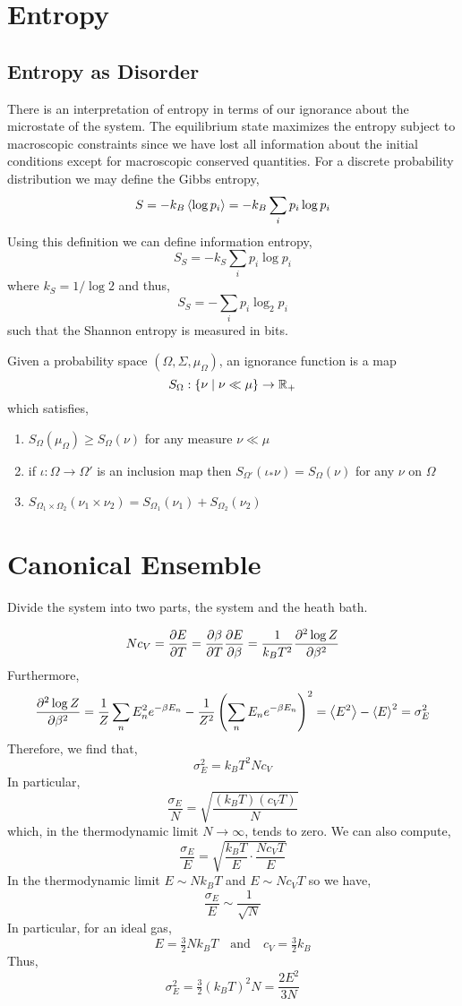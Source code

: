 \documentclass[12pt]{article}
\begin{document}
\section{Entropy}

\subsection{Entropy as Disorder}

There is an interpretation of entropy in terms of our ignorance about the microstate of the system. The equilibrium state maximizes the entropy subject to macroscopic constraints since we have lost all information about the initial conditions except for macroscopic conserved quantities. 
For a discrete probability distribution we may define the Gibbs entropy,
\[ S = - k_B \left< \log{p_i} \right> = - k_B \sum_i p_i \log{p_i} \]
Using this definition we can define information entropy,
\[ S_S = - k_S \sum_i p_i \log{p_i} \]
where $k_S = 1/\log{2}$ and thus,
\[ S_S = - \sum_i p_i \log_{2}{p_i} \]
such that the Shannon entropy is measured in bits. 

\begin{definition}
Given a probability space $(\Omega, \Sigma, \mu_\Omega)$, an ignorance function is a map
\[ S_\Omega : \{ \nu \mid \nu \ll \mu \} \to \mathbb{R}_+ \]
which satisfies,
\begin{enumerate}
\item $S_\Omega(\mu_\Omega) \ge S_\Omega(\nu)$ for any measure $\nu \ll \mu$
\item if $\iota : \Omega \to \Omega'$ is an inclusion map then $S_{\Omega'}(\iota_* \nu) = S_{\Omega}(\nu)$ for any $\nu$ on $\Omega$
\item  $S_{\Omega_1 \times \Omega_2}(\nu_1 \times \nu_2) = S_{\Omega_1}(\nu_1) + S_{\Omega_2}(\nu_2)$
\end{enumerate}
\end{definition}

\section{Canonical Ensemble}

Divide the system into two parts, the system and the heath bath. 


\[ N c_V = \frac{\partial{E}}{\partial{T}} = \frac{\partial{\beta}}{\partial{T}} \frac{\partial{E}}{\partial{\beta}} = \frac{1}{k_B T^2} \frac{\partial^2 \log{Z}}{\partial \beta^2} \]
Furthermore,
\[ \frac{\partial^2 \log{Z}}{\partial \beta^2} = \frac{1}{Z} \sum_n E_n^2 e^{-\beta E_n} - \frac{1}{Z^2} \left( \sum_n E_n e^{-\beta E_n} \right)^2 = \left< E^2 \right> - \left< E \right>^2 = \sigma_E^2 \]
Therefore, we find that,
\[ \sigma_E^2 = k_B T^2 N c_V \]  
In particular,
\[ \frac{\sigma_E}{N} = \sqrt{\frac{(k_B T)( c_V T)}{N}} \]
which, in the thermodynamic limit $N \to \infty$, tends to zero. We can also compute,
\[ \frac{\sigma_E}{E} = \sqrt{\frac{k_B T}{E} \cdot \frac{N c_V T}{E}} \]
In the thermodynamic limit $E \sim N k_B T$ and $E \sim N c_V T$ so we have,
\[ \frac{\sigma_E}{E} \sim \frac{1}{\sqrt{N}} \]  
In particular, for an ideal gas,
\[ E = \tfrac{3}{2} N k_B T \quad \text{and} \quad c_V = \tfrac{3}{2} k_B \]
Thus,
\[ \sigma_E^2 = \tfrac{3}{2} (k_B T)^2 N = \frac{2 E^2}{3 N} \]
\end{document}
